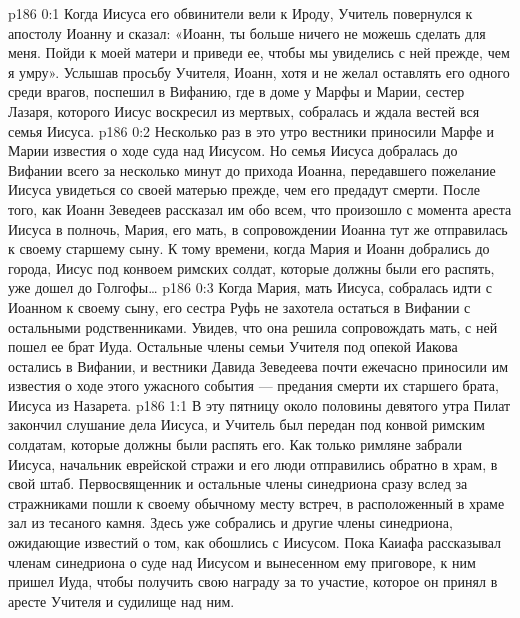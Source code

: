 \vs p186 0:1 Когда Иисуса его обвинители вели к Ироду, Учитель повернулся к апостолу Иоанну и сказал: «Иоанн, ты больше ничего не можешь сделать для меня. Пойди к моей матери и приведи ее, чтобы мы увиделись с ней прежде, чем я умру». Услышав просьбу Учителя, Иоанн, хотя и не желал оставлять его одного среди врагов, поспешил в Вифанию, где в доме у Марфы и Марии, сестер Лазаря, которого Иисус воскресил из мертвых, собралась и ждала вестей вся семья Иисуса.
\vs p186 0:2 Несколько раз в это утро вестники приносили Марфе и Марии известия о ходе суда над Иисусом. Но семья Иисуса добралась до Вифании всего за несколько минут до прихода Иоанна, передавшего пожелание Иисуса увидеться со своей матерью прежде, чем его предадут смерти. После того, как Иоанн Зеведеев рассказал им обо всем, что произошло с момента ареста Иисуса в полночь, Мария, его мать, в сопровождении Иоанна тут же отправилась к своему старшему сыну. К тому времени, когда Мария и Иоанн добрались до города, Иисус под конвоем римских солдат, которые должны были его распять, уже дошел до Голгофы\ldots
\vs p186 0:3 Когда Мария, мать Иисуса, собралась идти с Иоанном к своему сыну, его сестра Руфь не захотела остаться в Вифании с остальными родственниками. Увидев, что она решила сопровождать мать, с ней пошел ее брат Иуда. Остальные члены семьи Учителя под опекой Иакова остались в Вифании, и вестники Давида Зеведеева почти ежечасно приносили им известия о ходе этого ужасного события --- предания смерти их старшего брата, Иисуса из Назарета.
\vs p186 1:1 В эту пятницу около половины девятого утра Пилат закончил слушание дела Иисуса, и Учитель был передан под конвой римским солдатам, которые должны были распять его. Как только римляне забрали Иисуса, начальник еврейской стражи и его люди отправились обратно в храм, в свой штаб. Первосвященник и остальные члены синедриона сразу вслед за стражниками пошли к своему обычному месту встреч, в расположенный в храме зал из тесаного камня. Здесь уже собрались и другие члены синедриона, ожидающие известий о том, как обошлись с Иисусом. Пока Каиафа рассказывал членам синедриона о суде над Иисусом и вынесенном ему приговоре, к ним пришел Иуда, чтобы получить свою награду за то участие, которое он принял в аресте Учителя и судилище над ним.
